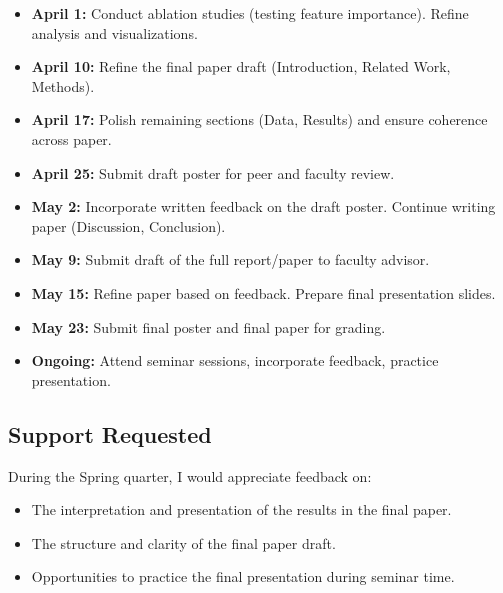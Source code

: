 \documentclass[
    a4paper, %
    10pt, %
    twoside %
]{LTJournalArticle}
\begin{document}
\begin{itemize}
    \item \textbf{April 1:} Conduct ablation studies (testing feature importance). Refine analysis and visualizations.
    \item \textbf{April 10:} Refine the final paper draft (Introduction, Related Work, Methods).
    \item \textbf{April 17:} Polish remaining sections (Data, Results) and ensure coherence across paper.
    \item \textbf{April 25:} Submit draft poster for peer and faculty review.
    \item \textbf{May 2:} Incorporate written feedback on the draft poster. Continue writing paper (Discussion, Conclusion).
    \item \textbf{May 9:} Submit draft of the full report/paper to faculty advisor.
    \item \textbf{May 15:} Refine paper based on feedback. Prepare final presentation slides.
    \item \textbf{May 23:} Submit final poster and final paper for grading.
    \item \textbf{Ongoing:} Attend seminar sessions, incorporate feedback, practice presentation.
\end{itemize}

\subsection{Support Requested}

During the Spring quarter, I would appreciate feedback on:
\begin{itemize}
    \item The interpretation and presentation of the results in the final paper.
    \item The structure and clarity of the final paper draft.
    \item Opportunities to practice the final presentation during seminar time.
\end{itemize}
\end{document}
